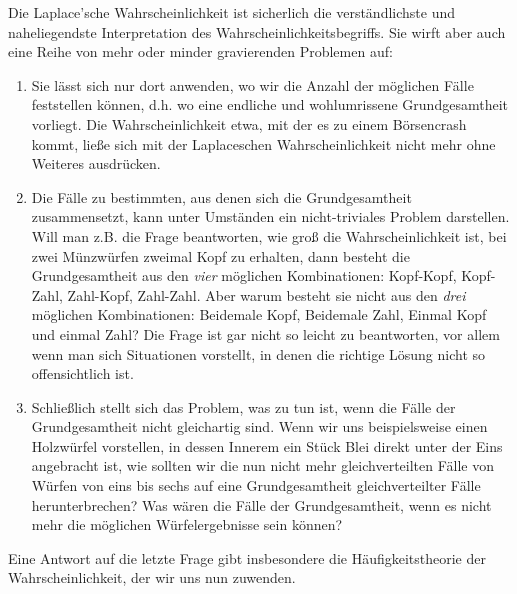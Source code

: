 Die Laplace'sche Wahrscheinlichkeit ist sicherlich die verständlichste und
naheliegendste Interpretation des Wahrscheinlichkeitsbegriffs. Sie wirft aber
auch eine Reihe von mehr oder minder gravierenden Problemen auf:
\begin{enumerate}
  \item Sie lässt sich nur dort anwenden, wo wir die Anzahl der möglichen Fälle
  feststellen können, d.h. wo eine endliche und wohlumrissene Grundgesamtheit
  vorliegt. Die Wahrscheinlichkeit etwa, mit der es zu einem Börsencrash kommt,
  ließe sich mit der Laplaceschen Wahrscheinlichkeit nicht mehr ohne Weiteres
  ausdrücken.
  \item Die Fälle zu bestimmten, aus denen sich die Grundgesamtheit
  zusammensetzt, kann unter Umständen ein nicht-triviales Problem darstellen.
  Will man z.B. die Frage beantworten, wie groß die Wahrscheinlichkeit ist, bei
  zwei Münzwürfen zweimal Kopf zu erhalten, dann besteht die Grundgesamtheit
  aus den {\em vier} möglichen Kombinationen: Kopf-Kopf, Kopf-Zahl,
  Zahl-Kopf, Zahl-Zahl. Aber warum besteht sie nicht aus den {\em drei}
  möglichen Kombinationen: Beidemale Kopf, Beidemale Zahl, Einmal Kopf und
  einmal Zahl? Die Frage ist gar nicht so leicht zu beantworten, vor allem wenn
  man sich Situationen vorstellt, in denen die richtige Lösung nicht so
  offensichtlich ist.
  \item Schließlich stellt sich das Problem, was zu tun ist, wenn die Fälle der
  Grundgesamtheit nicht gleichartig sind. Wenn wir uns beispielsweise einen
  Holzwürfel vorstellen, in dessen Innerem ein Stück Blei direkt unter der Eins
  angebracht ist, wie sollten wir die nun nicht mehr gleichverteilten Fälle von
  Würfen von eins bis sechs auf eine Grundgesamtheit gleichverteilter Fälle
  herunterbrechen? Was wären die Fälle der Grundgesamtheit, wenn es nicht mehr
  die möglichen Würfelergebnisse sein können?
\end{enumerate} 

Eine Antwort auf die letzte Frage gibt insbesondere die Häufigkeitstheorie der
Wahrscheinlichkeit, der wir uns nun zuwenden.

